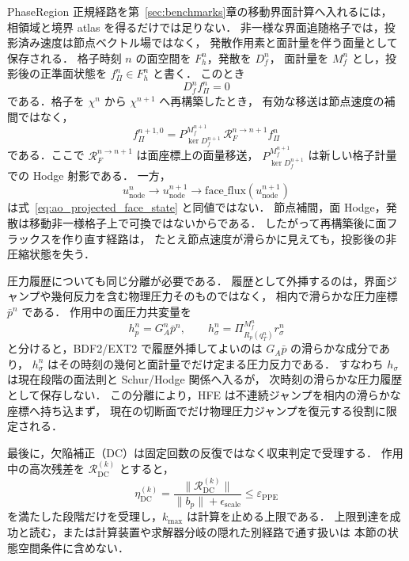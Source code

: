 PhaseRegion 正規経路を第~\ref{sec:benchmarks}章の移動界面計算へ入れるには，
相領域と境界 atlas を得るだけでは足りない．
非一様な界面追随格子では，投影済み速度は節点ベクトル場ではなく，
発散作用素と面計量を伴う面量として保存される．
格子時刻 $n$ の面空間を $F_h^n$，発散を $D_f^n$，
面計量を $M_f^n$ とし，投影後の正準面状態を
$f_\Pi^n\in F_h^n$ と書く．
このとき
\begin{equation}
  D_f^n f_\Pi^n = 0
  \label{eq:ao_projected_face_state}
\end{equation}
である．格子を $\chi^n$ から $\chi^{n+1}$ へ再構築したとき，
有効な移送は節点速度の補間ではなく，
\begin{equation}
  f_{\Pi}^{n+1,0}
  =
  P_{\ker D_f^{n+1}}^{M_f^{n+1}}\,
  \mathcal{R}_{F}^{n\to n+1} f_\Pi^n
  \label{eq:ao_face_cochain_regrid}
\end{equation}
である．ここで $\mathcal{R}_{F}^{n\to n+1}$ は面座標上の面量移送，
$P_{\ker D_f^{n+1}}^{M_f^{n+1}}$ は新しい格子計量での Hodge 射影である．
一方，
\[
  u^n_{\mathrm{node}}
  \longrightarrow
  u^{n+1}_{\mathrm{node}}
  \longrightarrow
  \mathrm{face\_flux}(u^{n+1}_{\mathrm{node}})
\]
は式~\eqref{eq:ao_projected_face_state} と同値ではない．
節点補間，面 Hodge，発散は移動非一様格子上で可換ではないからである．
したがって再構築後に面フラックスを作り直す経路は，
たとえ節点速度が滑らかに見えても，投影後の非圧縮状態を失う．

圧力履歴についても同じ分離が必要である．
履歴として外挿するのは，界面ジャンプや幾何反力を含む物理圧力そのものではなく，
相内で滑らかな圧力座標 $\bar p^n$ である．
作用中の面圧力共変量を
\begin{equation}
  h_p^n = G_A^n\bar p^n,\qquad
  h_\sigma^n = \Pi_{R_p(q_T^n)}^{M_f^n} r_\sigma^n
  \label{eq:ao_pressure_coordinate_split}
\end{equation}
と分けると，BDF2/EXT2 で履歴外挿してよいのは $G_A\bar p$ の滑らかな成分であり，
$h_\sigma^n$ はその時刻の幾何と面計量でだけ定まる圧力反力である．
すなわち $h_\sigma$ は現在段階の面法則と Schur/Hodge 関係へ入るが，
次時刻の滑らかな圧力履歴として保存しない．
この分離により，HFE は不連続ジャンプを相内の滑らかな座標へ持ち込まず，
現在の切断面でだけ物理圧力ジャンプを復元する役割に限定される．

最後に，欠陥補正（DC）は固定回数の反復ではなく収束判定で受理する．
作用中の高次残差を $\mathcal{R}_{\mathrm{DC}}^{(k)}$ とすると，
\begin{equation}
  \eta_{\mathrm{DC}}^{(k)}
  =
  \frac{\|\mathcal{R}_{\mathrm{DC}}^{(k)}\|}
       {\|b_p\|+\epsilon_{\mathrm{scale}}}
  \le \varepsilon_{\mathrm{PPE}}
  \label{eq:ao_dc_convergence_gate}
\end{equation}
を満たした段階だけを受理し，$k_{\max}$ は計算を止める上限である．
上限到達を成功と読む，または計算装置や求解器分岐の隠れた別経路で通す扱いは
本節の状態空間条件に含めない．

